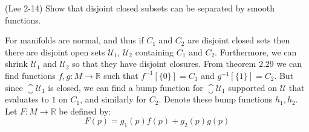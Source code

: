 \documentclass{article}                                                        %
\begin{document}
        \begin{problem}
            (Lee 2-14) Show that disjoint closed subsets can be separated by
            smooth functions.
        \end{problem}
        \begin{solution}
            For manifolds are normal, and thus if $C_{1}$ and $C_{2}$ are
            disjoint closed sets then there are disjoint open sets
            $\mathcal{U}_{1}$, $\mathcal{U}_{2}$ containing $C_{1}$ and $C_{2}$.
            Furthermore, we can shrink $\mathcal{U}_{1}$ and $\mathcal{U}_{2}$
            so that they have disjoint closures. From theorem 2.29 we can find
            functions $f,g:M\rightarrow\mathbb{R}$ such that
            $f^{\minus{1}}[\{0\}]=C_{1}$ and $g^{\minus{1}}[\{1\}]=C_{2}$.
            But since $\closure{\mathcal{U}_{1}}$ is closed, we can find a bump
            function for $\closure{\mathcal{U}_{1}}$ supported on $\mathcal{U}$
            that evaluates to $1$ on $C_{1}$, and similarly for $C_{2}$.
            Denote these bump functions $h_{1},h_{2}$. Let
            $F:M\rightarrow\mathbb{R}$ be defined by:
            \begin{equation}
                F(p)=g_{1}(p)f(p)+g_{2}(p)g(p)
            \end{equation}
        \end{solution}
\end{document}
